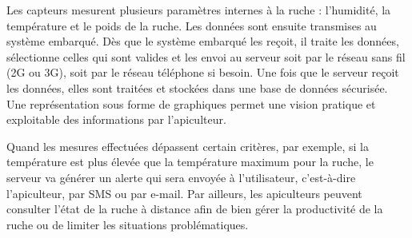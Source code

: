 Les capteurs mesurent plusieurs paramètres internes à la ruche : l'humidité, la température et le poids de la ruche. Les données sont ensuite transmises au système embarqué. Dès que le système embarqué les reçoit, il traite les données, sélectionne celles qui sont valides et les envoi au serveur soit par le réseau sans fil (2G ou 3G), soit par le réseau téléphone si besoin. Une fois que le serveur reçoit les données, elles sont traitées et stockées dans une base de données sécurisée. Une représentation sous forme de graphiques permet une vision pratique et exploitable des informations par l'apiculteur.

Quand les mesures effectuées dépassent certain critères, par exemple, si la température est plus élevée que la température maximum pour la ruche, le serveur va générer un alerte qui sera envoyée à l'utilisateur, c'est-à-dire l'apiculteur, par SMS ou par e-mail. Par ailleurs, les apiculteurs peuvent consulter l’état de la ruche à distance afin de bien gérer la productivité de la ruche ou de limiter les situations problématiques. 

